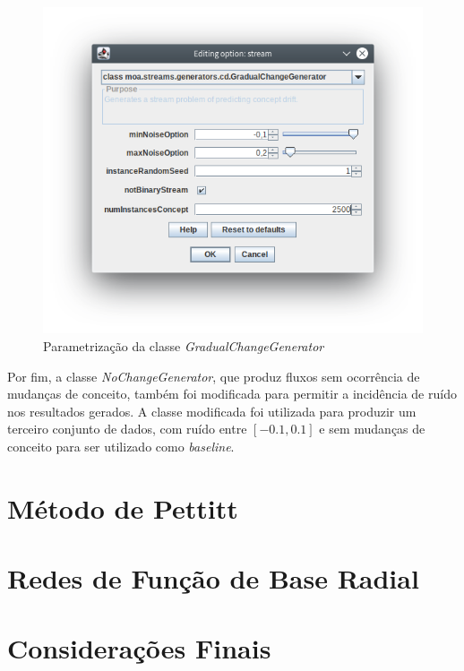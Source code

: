 \documentclass[qual, classic, a4paper]{ufbathesis}
\begin{document}
\begin{figure}[H]
    \begin{center}
        \includegraphics[width=\textwidth]{imagens/gradual_change_generator.png}
        \caption{Parametrização da classe \textit{GradualChangeGenerator}}
        \label{fig:gradual_change_generator}
    \end{center}
\end{figure}

Por fim, a classe \textit{NoChangeGenerator}, que produz fluxos sem ocorrência de mudanças de conceito, também foi modificada para permitir a incidência de ruído nos resultados gerados.
A classe modificada foi utilizada para produzir um terceiro conjunto de dados, com ruído entre $[-0.1, 0.1]$ e sem mudanças de conceito para ser utilizado como \textit{baseline}.

\section{Método de Pettitt}
\blindtext
 
\section{Redes de Função de Base Radial}
\blindtext

\section{Considerações Finais}
\blindtext
\end{document}
